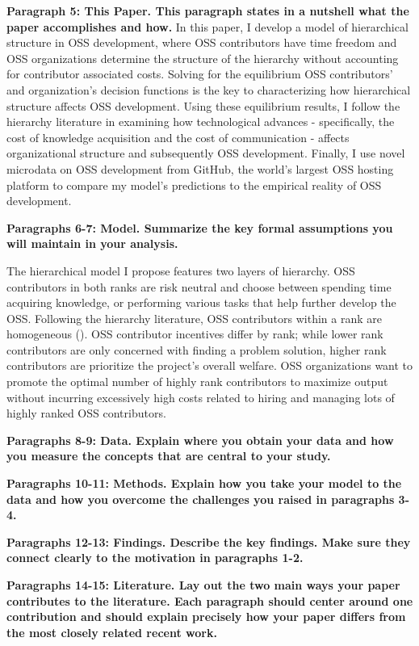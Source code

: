 \documentclass[12pt,notitlepage]{article}
\begin{document}
\textbf{Paragraph 5: This Paper. This paragraph states in a nutshell what the paper accomplishes and how. }
In this paper, I develop a model of hierarchical structure in OSS development, where OSS contributors have time freedom and OSS organizations determine the structure of the hierarchy without accounting for contributor associated costs. Solving for the equilibrium OSS contributors' and organization's decision functions is the key to characterizing how hierarchical structure affects OSS development. Using these equilibrium results, I follow the hierarchy literature in examining how technological advances - specifically, the cost of knowledge acquisition and the cost of communication - affects organizational structure and subsequently OSS development. Finally, I use novel microdata on OSS development from GitHub, the world's largest OSS hosting platform to compare my model's predictions to the empirical reality of OSS development. 

\textbf{Paragraphs 6-7: Model. Summarize the key formal assumptions you will maintain in your analysis.}

\qquad The hierarchical model I propose features two layers of hierarchy. OSS contributors in both ranks are risk neutral and choose between spending time acquiring knowledge, or performing various tasks that help further develop the OSS. Following the hierarchy literature, OSS contributors within a rank are homogeneous (\cite{garicano_hierarchies_2000}). OSS contributor incentives differ by rank; while lower rank contributors are only concerned with finding a problem solution, higher rank contributors are prioritize the project's overall welfare. OSS organizations want to promote the optimal number of highly rank contributors to maximize output without incurring excessively high costs related to hiring and managing lots of highly ranked OSS contributors. 

\textbf{Paragraphs 8-9: Data. Explain where you obtain your data and how you measure the concepts that are central to your study.}

\textbf{Paragraphs 10-11: Methods. Explain how you take your model to the data and how you overcome the challenges you raised in paragraphs 3-4.}

\textbf{Paragraphs 12-13: Findings. Describe the key findings. Make sure they connect clearly to the motivation in paragraphs 1-2.}

\textbf{Paragraphs 14-15: Literature. Lay out the two main ways your paper contributes to the literature. Each paragraph should center around one contribution and should explain precisely how your paper differs from the most closely related recent work.}
\end{document}
